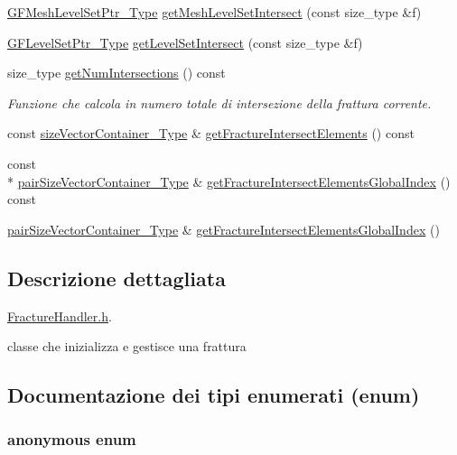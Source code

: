 \begin{DoxyCompactItemize}
\hyperlink{Core_8h_a1cbde831f5a62206e084de1c5de27000}{G\-F\-Mesh\-Level\-Set\-Ptr\-\_\-\-Type} \hyperlink{classFractureHandler_a69b5921703089ac725df60b08eb821c1}{get\-Mesh\-Level\-Set\-Intersect} (const size\-\_\-type \&f)
\item 
\hyperlink{Core_8h_a036173458a8a25c7c03f8c76d97e9580}{G\-F\-Level\-Set\-Ptr\-\_\-\-Type} \hyperlink{classFractureHandler_a3c2efa9ded1347b095e2b3247e728894}{get\-Level\-Set\-Intersect} (const size\-\_\-type \&f)
\item 
size\-\_\-type \hyperlink{classFractureHandler_aa66dc3447c3bafc87e61f5b232c98acb}{get\-Num\-Intersections} () const 
\begin{DoxyCompactList}\small\item\em Funzione che calcola in numero totale di intersezione della frattura corrente. \end{DoxyCompactList}\item 
const \hyperlink{Core_8h_a80e8381d86ecb0a7f4f87ff84d1a0be5}{size\-Vector\-Container\-\_\-\-Type} \& \hyperlink{classFractureHandler_ab722c7fb4c48e062a8060251c4cb80c3}{get\-Fracture\-Intersect\-Elements} () const 
\item 
const \\*
\hyperlink{Core_8h_a9bc476e433f99b82a9c2b8560735c7b5}{pair\-Size\-Vector\-Container\-\_\-\-Type} \& \hyperlink{classFractureHandler_a7f439a7c14b6064d52984130f8bcb7c1}{get\-Fracture\-Intersect\-Elements\-Global\-Index} () const 
\item 
\hyperlink{Core_8h_a9bc476e433f99b82a9c2b8560735c7b5}{pair\-Size\-Vector\-Container\-\_\-\-Type} \& \hyperlink{classFractureHandler_ac4156ff43fcdc7a4641aef8cdabf2357}{get\-Fracture\-Intersect\-Elements\-Global\-Index} ()
\end{DoxyCompactItemize}


\subsection{Descrizione dettagliata}
\hyperlink{FractureHandler_8h}{Fracture\-Handler.\-h}. 

classe che inizializza e gestisce una frattura 

\subsection{Documentazione dei tipi enumerati (enum)}
\hypertarget{classFractureHandler_a495ad4fc72d0c47c8f0424842f1153aa}{\subsubsection[{anonymous enum}]{\setlength{\rightskip}{0pt plus 5cm}anonymous enum}}\label{classFractureHandler_a495ad4fc72d0c47c8f0424842f1153aa}


